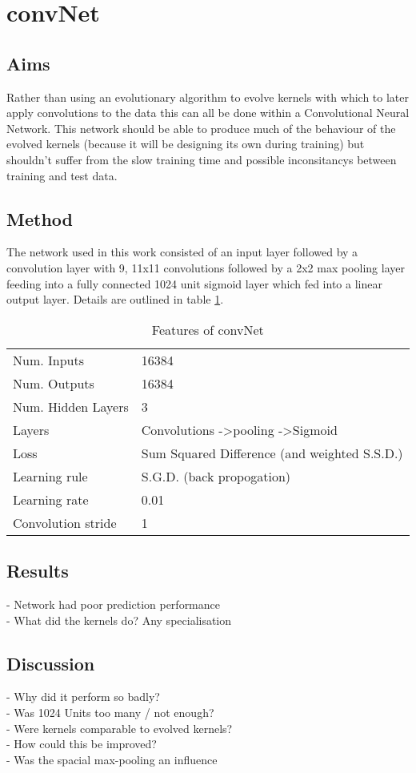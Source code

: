 \section{convNet}

\subsection{Aims}
Rather than using an evolutionary algorithm to evolve kernels with which to later apply convolutions to the data this can all be done within a Convolutional Neural Network. 
This network should be able to produce much of the behaviour of the evolved kernels (because it will be designing its own during training) but shouldn't suffer from the slow training time and possible inconsitancys between training and test data.

\subsection{Method}
The network used in this work consisted of an input layer followed by a convolution layer with 9, 11x11 convolutions followed by a 2x2 max pooling layer feeding into a fully connected 1024 unit sigmoid layer which fed into a linear output layer. Details are outlined in table \ref{tb:convNetdef}.

\begin{table}[h]
\centering
\begin{tabular}{ | l | l | }
    \hline
    Num. Inputs & 16384 \\
    Num. Outputs & 16384 \\
    Num. Hidden Layers & 3 \\
    Layers & Convolutions -\textgreater pooling -\textgreater Sigmoid \\
    Loss & Sum Squared Difference (and weighted S.S.D.) \\
    Learning rule & S.G.D. (back propogation) \\
    Learning rate & 0.01 \\
    Convolution stride & 1 \\
    \hline
\end{tabular}
\caption{Features of convNet}
\label{tb:convNetdef}
\end{table}


\subsection{Results}
- Network had poor prediction performance
\\ - What did the kernels do? Any specialisation

\subsection{Discussion}
 - Why did it perform so badly?
\\ - Was 1024 Units too many / not enough?
\\ - Were kernels comparable to evolved kernels?
\\ - How could this be improved?
\\ - Was the spacial max-pooling an influence

